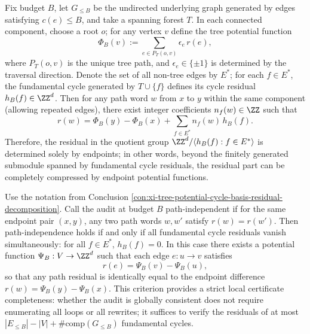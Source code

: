 \begin{conclusion}\label{con:xi-tree-potential-cycle-basis-residual-decomposition}
Fix budget \(B\), let \(G_{\le B}\) be the undirected underlying graph generated by edges satisfying \(c(e)\le B\), and take a spanning forest \(T\).
In each connected component, choose a root \(o\); for any vertex \(v\) define the tree potential function
\[
\Phi_B(v):=\sum_{e\in P_T(o,v)} \epsilon_e\, r(e),
\]
where \(P_T(o,v)\) is the unique tree path, and \(\epsilon_e\in\{\pm1\}\) is determined by the traversal direction.
Denote the set of all non-tree edges by \(E^\ast\); for each \(f\in E^\ast\), the fundamental cycle generated by \(T\cup\{f\}\) defines its cycle residual \(h_B(f)\in\ZZ^d\).
Then for any path word \(w\) from \(x\) to \(y\) within the same component (allowing repeated edges), there exist integer coefficients \(n_f(w)\in\ZZ\) such that
\[
r(w)=\Phi_B(y)-\Phi_B(x)+\sum_{f\in E^\ast} n_f(w)\,h_B(f).
\]
Therefore, the residual in the quotient group
\(
\ZZ^d/\langle h_B(f):f\in E^\ast\rangle
\)
is determined solely by endpoints; in other words, beyond the finitely generated submodule spanned by fundamental cycle residuals, the residual part can be completely compressed by endpoint potential functions.
\end{conclusion}

\begin{conclusion}\label{con:xi-global-audit-consistency-finite-test}
Use the notation from Conclusion \ref{con:xi-tree-potential-cycle-basis-residual-decomposition}.
Call the audit at budget \(B\) path-independent if for the same endpoint pair \((x,y)\), any two path words \(w,w'\) satisfy \(r(w)=r(w')\).
Then path-independence holds if and only if all fundamental cycle residuals vanish simultaneously: for all \(f\in E^\ast\), \(h_B(f)=0\).
In this case there exists a potential function \(\Psi_B:V\to\ZZ^d\) such that each edge \(e:u\to v\) satisfies
\[
r(e)=\Psi_B(v)-\Psi_B(u),
\]
so that any path residual is identically equal to the endpoint difference \(r(w)=\Psi_B(y)-\Psi_B(x)\).
This criterion provides a strict local certificate completeness: whether the audit is globally consistent does not require enumerating all loops or all rewrites; it suffices to verify the residuals of at most
\(
|E_{\le B}|-|V|+\#\mathrm{comp}(G_{\le B})
\)
fundamental cycles.
\end{conclusion}

